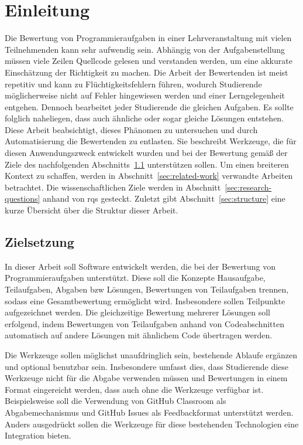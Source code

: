 \chapter{Einleitung}\label{ch:introduction}

Die Bewertung von Programmieraufgaben in einer Lehrveranstaltung mit vielen Teilnehmenden kann sehr aufwendig sein.
Abhängig von der Aufgabenstellung müssen viele Zeilen Quellcode gelesen und verstanden werden, um eine akkurate Einschätzung der Richtigkeit zu machen.
Die Arbeit der Bewertenden ist meist repetitiv und kann zu Flüchtigkeitsfehlern führen, wodurch Studierende möglicherweise nicht auf Fehler hingewiesen werden und einer Lerngelegenheit entgehen.
Dennoch bearbeitet jeder Studierende die gleichen Aufgaben.
Es sollte folglich naheliegen, dass auch ähnliche oder sogar gleiche Lösungen entstehen.
Diese Arbeit beabsichtigt, dieses Phänomen zu untersuchen und durch Automatisierung die Bewertenden zu entlasten.
Sie beschreibt Werkzeuge, die für diesen Anwendungszweck entwickelt wurden und bei der Bewertung gemäß der Ziele des nachfolgenden Abschnitts~\ref{sec:goals} unterstützen sollen.
Um einen breiteren Kontext zu schaffen, werden in Abschnitt~\ref{sec:related-work} verwandte Arbeiten betrachtet.
Die wissenschaftlichen Ziele werden in Abschnitt~\ref{sec:research-questions} anhand von \acp{rq} gesteckt.
Zuletzt gibt Abschnitt~\ref{sec:structure} eine kurze Übersicht über die Struktur dieser Arbeit.

\section{Zielsetzung}\label{sec:goals}

In dieser Arbeit soll Software entwickelt werden, die bei der Bewertung von Programmieraufgaben unterstützt.
Diese soll die Konzepte Hausaufgabe, Teilaufgaben, Abgaben \ac{bzw} Lösungen, Bewertungen von Teilaufgaben trennen, sodass eine Gesamtbewertung ermöglicht wird.
Insbesondere sollen Teilpunkte aufgezeichnet werden.
Die gleichzeitige Bewertung mehrerer Lösungen soll erfolgend, indem Bewertungen von Teilaufgaben anhand von Codeabschnitten automatisch auf andere Lösungen mit ähnlichem Code übertragen werden.

Die Werkzeuge sollen möglichst unaufdringlich sein, bestehende Ablaufe ergänzen und optional benutzbar sein.
Insbesondere umfasst dies, dass Studierende diese Werkzeuge nicht für die Abgabe verwenden müssen und Bewertungen in einem Format eingereicht werden, dass auch ohne die Werkzeuge verfügbar ist.
Beispielsweise soll die Verwendung von GitHub Classroom als Abgabemechanismus und GitHub Issues als Feedbackformat unterstützt werden.
Anders ausgedrückt sollen die Werkzeuge für diese bestehenden Technologien eine Integration bieten.

